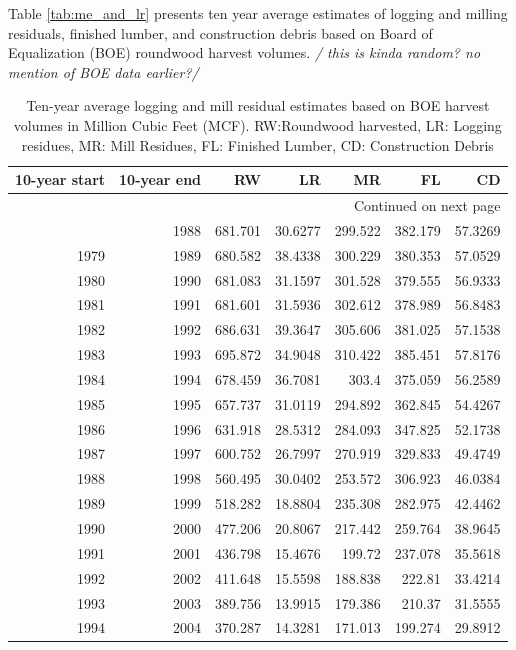 \documentclass[a4paper]{article}
\begin{document}
Table \ref{tab:me_and_lr} presents ten year average estimates of logging and milling residuals, finished lumber, and construction debris based on Board of Equalization (BOE) roundwood harvest volumes. \emph{/ this is kinda random? no mention of BOE data earlier?/}

\begin{longtable}{rrrrrrr}
\caption{Ten-year average logging and mill residual estimates based on BOE harvest volumes in Million Cubic Feet (MCF). RW:Roundwood harvested, LR: Logging residues, MR: Mill Residues, FL: Finished Lumber, CD: Construction Debris}
\\
10-year start & 10-year end & RW & LR & MR & FL & CD\\
\hline
\endhead
\hline\multicolumn{7}{r}{Continued on next page} \\
\endfoot
\endlastfoot
1978 & 1988 & 681.701 & 30.6277 & 299.522 & 382.179 & 57.3269\\
1979 & 1989 & 680.582 & 38.4338 & 300.229 & 380.353 & 57.0529\\
1980 & 1990 & 681.083 & 31.1597 & 301.528 & 379.555 & 56.9333\\
1981 & 1991 & 681.601 & 31.5936 & 302.612 & 378.989 & 56.8483\\
1982 & 1992 & 686.631 & 39.3647 & 305.606 & 381.025 & 57.1538\\
1983 & 1993 & 695.872 & 34.9048 & 310.422 & 385.451 & 57.8176\\
1984 & 1994 & 678.459 & 36.7081 & 303.4 & 375.059 & 56.2589\\
1985 & 1995 & 657.737 & 31.0119 & 294.892 & 362.845 & 54.4267\\
1986 & 1996 & 631.918 & 28.5312 & 284.093 & 347.825 & 52.1738\\
1987 & 1997 & 600.752 & 26.7997 & 270.919 & 329.833 & 49.4749\\
1988 & 1998 & 560.495 & 30.0402 & 253.572 & 306.923 & 46.0384\\
1989 & 1999 & 518.282 & 18.8804 & 235.308 & 282.975 & 42.4462\\
1990 & 2000 & 477.206 & 20.8067 & 217.442 & 259.764 & 38.9645\\
1991 & 2001 & 436.798 & 15.4676 & 199.72 & 237.078 & 35.5618\\
1992 & 2002 & 411.648 & 15.5598 & 188.838 & 222.81 & 33.4214\\
1993 & 2003 & 389.756 & 13.9915 & 179.386 & 210.37 & 31.5555\\
1994 & 2004 & 370.287 & 14.3281 & 171.013 & 199.274 & 29.8912\\

\end{longtable}
\end{document}
